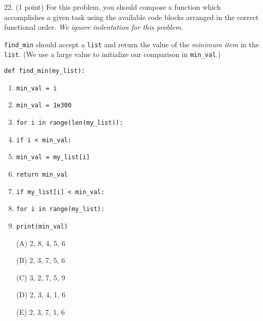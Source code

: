 \documentclass{article}
\begin{document}
\noindent
\begin{minipage}{\textwidth}
22. (1 point)
For this problem, you should compose a function which accomplishes a given task using the available code blocks arranged in the correct functional order.  \emph{We ignore indentation for this problem.}

\texttt{find\_min} should accept a \texttt{list} and return the value of the \emph{minimum item} in the \texttt{list}.  (We use a large value to initialize our comparison in \texttt{min\_val}.)

\begin{verbatim}
def find_min(my_list):
\end{verbatim}

\begin{enumerate}[1]
\item \texttt{min\_val = i}
\item \texttt{min\_val = 1e300}
\item \texttt{for i in range(len(my\_list)):}
\item \texttt{if i < min\_val:}
\item \texttt{min\_val = my\_list[i]}
\item \texttt{return min\_val}
\item \texttt{if my\_list[i] < min\_val:}
\item \texttt{for i in range(my\_list):}
\item \texttt{print(min\_val)}
\end{enumerate}


\begin{enumerate}
\item[(A)]
2, 8, 4, 5, 6

\item[(B)]
2, 3, 7, 5, 6

\item[(C)]
3, 2, 7, 5, 9

\item[(D)]
2, 3, 4, 1, 6

\item[(E)]
2, 3, 7, 1, 6

\end{enumerate}
\end{minipage}
\vspace{10em}
\filbreak\vfil{}\vfilneg
\end{document}

